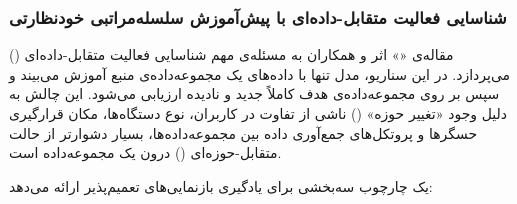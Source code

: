 \subsubsection{شناسایی فعالیت متقابل-داده‌ای با پیش‌آموزش سلسله‌مراتبی خودنظارتی}

مقاله‌ی «» اثر  و همکاران \cite{hong2024crosshar} به مسئله‌ی مهم شناسایی فعالیت متقابل-داده‌ای () می‌پردازد. در این سناریو، مدل تنها با داده‌های یک مجموعه‌داده‌ی منبع آموزش می‌بیند و سپس بر روی مجموعه‌داده‌ی هدف کاملاً جدید و نادیده ارزیابی می‌شود. این چالش به دلیل وجود «تغییر حوزه» () ناشی از تفاوت در کاربران، نوع دستگاه‌ها، مکان قرارگیری حسگرها و پروتکل‌های جمع‌آوری داده بین مجموعه‌داده‌ها، بسیار دشوارتر از حالت متقابل-حوزه‌ای () درون یک مجموعه‌داده است.

 یک چارچوب سه‌بخشی برای یادگیری بازنمایی‌های تعمیم‌پذیر ارائه می‌دهد:

